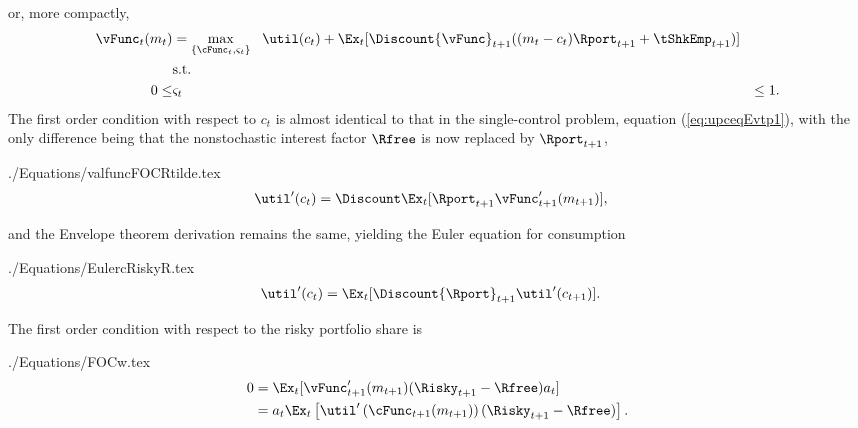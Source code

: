 \documentclass[titlepage]{\econtex}
\begin{document}

or, more compactly,
\begin{equation*}\begin{gathered}\begin{aligned}
  {\vFunc}_{t}({m}_{t})  & = \max_{\{\cFunc_{t},\varsigma_{t}\}} ~~  \util({c}_{t}) +  \Ex_{t}[\Discount {\vFunc}_{t+1}(({m}_{t}-{c}_{t}){\Rport}_{t+1} +        {\tShkEmp}_{t+1})]
  \\                       & \text{s.t.} & \nonumber
  \\ 0 \leq & \varsigma_{t} & \leq 1
                              .
\end{aligned}\end{gathered}\end{equation*}
The first order condition with respect to ${c}_{t}$ is almost identical
to that in the single-control problem, equation (\ref{eq:upceqEvtp1}),
with the only difference being that the nonstochastic interest factor
$\Rfree$ is now replaced by ${\Rport}_{t+1}$,
\begin{verbatimwrite}{./Equations/valfuncFOCRtilde.tex}
  \begin{equation}\begin{gathered}\begin{aligned}
    \util^{\prime}({c}_{t})  & = \Discount \Ex_{t} [{\Rport}_{t+1} \vFunc^{\prime}_{t+1}({m}_{t+1})] \label{eq:valfuncFOCRtilde},
  \end{aligned}\end{gathered}\end{equation}
\end{verbatimwrite}

and the Envelope theorem derivation remains the same, 
yielding the Euler equation for consumption
\begin{verbatimwrite}{./Equations/EulercRiskyR.tex}
  \begin{equation}\begin{gathered}\begin{aligned}
    \util^{\prime}({c}_{t})  & = \Ex_{t}[\Discount {\Rport}_{t+1} \util^{\prime}({c}_{t+1})]. \label{eq:EulercRiskyR}
  \end{aligned}\end{gathered}\end{equation}
\end{verbatimwrite}


The first order condition with respect to the risky portfolio share is
\begin{verbatimwrite}{./Equations/FOCw.tex}
  \begin{equation}\begin{gathered}\begin{aligned}
    0  & = \Ex_{t}[{\vFunc}_{t+1}^{\prime}({m}_{t+1})(\Risky_{t+1}-\Rfree){a}_{t}] \notag
    \\         & = {a}_{t}\Ex_{t}\left[\util^{\prime}\left(\cFunc_{t+1}({m}_{t+1})\right)(\Risky_{t+1}-\Rfree)\right] \label{eq:FOCw}.
  \end{aligned}\end{gathered}\end{equation}
\end{verbatimwrite}

\end{document}
